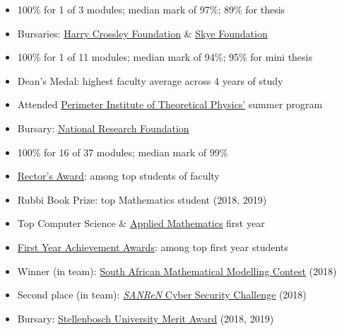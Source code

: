 \documentclass[10pt,a4paper,ragged2e,withhyper]{altacv}
\begin{document}
\begin{paracol}{2}
\begin{itemize}
    \item 100\% for 1 of 3 modules; median mark of 97\%; 89\% for thesis
    \item Bursaries: \href{https://thecrossleyfoundation.co.za/}{Harry Crossley Foundation}
		\& \href{http://skyefoundation.co.za/awards/awards-by-year/}{Skye Foundation}
\end{itemize}

\begin{itemize}
    \item 100\% for 1 of 11 modules; median mark of 94\%; 95\% for mini thesis
    \item Dean's Medal: highest faculty average across 4 years of study
    \item Attended \href{https://perimeterinstitute.ca/}%
		{Perimeter Institute of Theoretical Physics'} summer program
    \item Bursary: \href{https://www.nrf.ac.za/}{National Research Foundation}
\end{itemize}

\begin{itemize}
    \item 100\% for 16 of 37 modules; median mark of 99\%
    \item \href{https://www.sun.ac.za/english/Lists/news/DispForm.aspx?ID=7717}{Rector's Award}:
		among top students of faculty
    \item Rubbi Book Prize: top Mathematics student (2018, 2019)
    \item Top Computer Science \& \href{https://appliedmaths.sun.ac.za/topachievers.html}{Applied Mathematics}
		first year
    \item \href{https://www.sun.ac.za/english/learning-teaching/ctl/t-l-awards-and-grants/first-years-prestige-dinner}%
		{First Year Achievement Awards}: among top first year students
    \item Winner (in team): \href{https://appliedmaths.sun.ac.za/sammc.html}%
		{South African Mathematical Modelling Contest} (2018)
    \item Second place (in team): \href{https://www.csc.ac.za/?page_id=665}%
		{\emph{SANReN} Cyber Security Challenge} (2018)
    \item Bursary: \href{https://finaid.sun.ac.za/merit-bursary}%
		{Stellenbosch University Merit Award} (2018, 2019)
\end{itemize}


\end{paracol}
\end{document}
